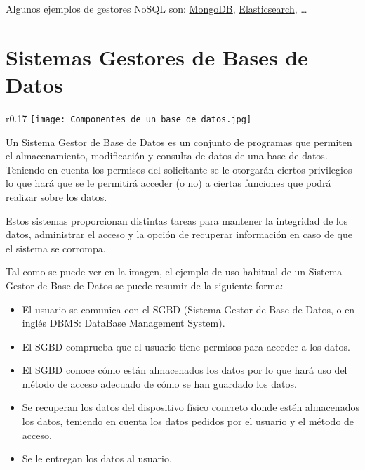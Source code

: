 Algunos ejemplos de gestores NoSQL son: \href{https://es.wikipedia.org/wiki/MongoDB}{MongoDB}, \href{https://es.wikipedia.org/wiki/Elasticsearch}{Elasticsearch}, …


\chapter{Sistemas Gestores de Bases de Datos}
\begin{wrapfigure}{r}{0.17\linewidth}
    \centering
    \vspace{-20pt}
    \texttt{[image: Componentes\_de\_un\_base\_de\_datos.jpg]}
    \vspace{-33pt}
    \vspace{-30pt}
\end{wrapfigure}
Un Sistema Gestor de Base de Datos es un conjunto de programas que permiten el almacenamiento, modificación y consulta de datos de una base de datos. Teniendo en cuenta los permisos del solicitante se le otorgarán ciertos privilegios lo que hará que se le permitirá acceder (o no) a ciertas funciones que podrá realizar sobre los datos.

Estos sistemas proporcionan distintas tareas para mantener la integridad de los datos, administrar el acceso y la opción de recuperar información en caso de que el sistema se corrompa.

Tal como se puede ver en la imagen, el ejemplo de uso habitual de un Sistema Gestor de Base de Datos se puede resumir de la siguiente forma:

\begin{itemize}
    \item El usuario se comunica con el SGBD (Sistema Gestor de Base de Datos, o en inglés DBMS: DataBase Management System).
    \item El SGBD comprueba que el usuario tiene permisos para acceder a los datos.
    \item El SGBD conoce cómo están almacenados los datos por lo que hará uso del método de acceso adecuado de cómo se han guardado los datos.
    \item Se recuperan los datos del dispositivo físico concreto donde estén almacenados los datos, teniendo en cuenta los datos pedidos por el usuario y el método de acceso.
    \item Se le entregan los datos al usuario.
\end{itemize}

